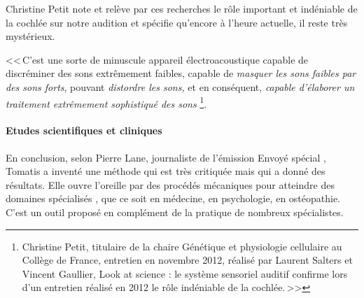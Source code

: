 Christine Petit note et relève par ces recherches le rôle important
et indéniable de la cochlée sur notre audition et spécifie qu'encore
à l'heure actuelle, il reste très mystérieux.

<<\,C'est une sorte de minuscule appareil électroacoustique capable
de discréminer des sons extrêmement faibles, capable de \emph{masquer
les sons faibles par des sons forts}, pouvant \emph{distordre les
sons,} et en conséquent, \emph{capable d'élaborer un traitement extrêmement
sophistiqué des sons}%
\footnote{Christine Petit, titulaire de la chaire Génétique et
physiologie cellulaire au Collège de France, entretien en novembre 2012, réalisé par Laurent Salters et Vincent Gaullier, Look at science : le système sensoriel auditif confirme lors d'un entretien réalisé en 2012 le rôle indéniable de la cochlée.\,>>}.


 \paragraph{Etudes scientifiques et cliniques}
 En conclusion, selon Pierre Lane, journaliste de l'é\-mi\-s\-sion Envoyé spécial%
\autocite{tomatis_methode_1991}, Tomatis
a inventé une méthode qui est très critiquée mais qui a donné des
résultats. Elle ouvre l'oreille par des procédés mécaniques pour atteindre
des domaines spécialisés , que ce soit en médecine, en psychologie,
en ostéopathie. C'est un outil proposé
en complément de la pratique de nombreux spécialistes. 

